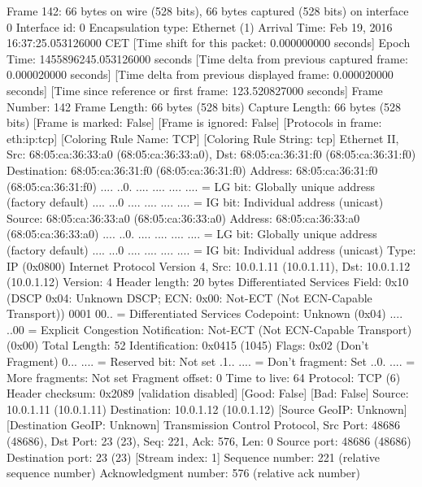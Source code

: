 Frame 142: 66 bytes on wire (528 bits), 66 bytes captured (528 bits) on interface 0
    Interface id: 0
    Encapsulation type: Ethernet (1)
    Arrival Time: Feb 19, 2016 16:37:25.053126000 CET
    [Time shift for this packet: 0.000000000 seconds]
    Epoch Time: 1455896245.053126000 seconds
    [Time delta from previous captured frame: 0.000020000 seconds]
    [Time delta from previous displayed frame: 0.000020000 seconds]
    [Time since reference or first frame: 123.520827000 seconds]
    Frame Number: 142
    Frame Length: 66 bytes (528 bits)
    Capture Length: 66 bytes (528 bits)
    [Frame is marked: False]
    [Frame is ignored: False]
    [Protocols in frame: eth:ip:tcp]
    [Coloring Rule Name: TCP]
    [Coloring Rule String: tcp]
Ethernet II, Src: 68:05:ca:36:33:a0 (68:05:ca:36:33:a0), Dst: 68:05:ca:36:31:f0 (68:05:ca:36:31:f0)
    Destination: 68:05:ca:36:31:f0 (68:05:ca:36:31:f0)
        Address: 68:05:ca:36:31:f0 (68:05:ca:36:31:f0)
        .... ..0. .... .... .... .... = LG bit: Globally unique address (factory default)
        .... ...0 .... .... .... .... = IG bit: Individual address (unicast)
    Source: 68:05:ca:36:33:a0 (68:05:ca:36:33:a0)
        Address: 68:05:ca:36:33:a0 (68:05:ca:36:33:a0)
        .... ..0. .... .... .... .... = LG bit: Globally unique address (factory default)
        .... ...0 .... .... .... .... = IG bit: Individual address (unicast)
    Type: IP (0x0800)
Internet Protocol Version 4, Src: 10.0.1.11 (10.0.1.11), Dst: 10.0.1.12 (10.0.1.12)
    Version: 4
    Header length: 20 bytes
    Differentiated Services Field: 0x10 (DSCP 0x04: Unknown DSCP; ECN: 0x00: Not-ECT (Not ECN-Capable Transport))
        0001 00.. = Differentiated Services Codepoint: Unknown (0x04)
        .... ..00 = Explicit Congestion Notification: Not-ECT (Not ECN-Capable Transport) (0x00)
    Total Length: 52
    Identification: 0x0415 (1045)
    Flags: 0x02 (Don't Fragment)
        0... .... = Reserved bit: Not set
        .1.. .... = Don't fragment: Set
        ..0. .... = More fragments: Not set
    Fragment offset: 0
    Time to live: 64
    Protocol: TCP (6)
    Header checksum: 0x2089 [validation disabled]
        [Good: False]
        [Bad: False]
    Source: 10.0.1.11 (10.0.1.11)
    Destination: 10.0.1.12 (10.0.1.12)
    [Source GeoIP: Unknown]
    [Destination GeoIP: Unknown]
Transmission Control Protocol, Src Port: 48686 (48686), Dst Port: 23 (23), Seq: 221, Ack: 576, Len: 0
    Source port: 48686 (48686)
    Destination port: 23 (23)
    [Stream index: 1]
    Sequence number: 221    (relative sequence number)
    Acknowledgment number: 576    (relative ack number)
